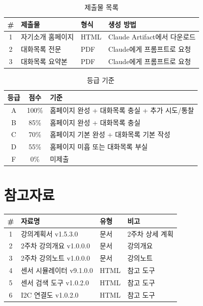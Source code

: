 \documentclass[11pt, a4paper]{article}
\begin{document}
\begin{table}[H]\centering
\caption{제출물 목록}
\begin{tabular}{clll}\toprule
\textbf{\#} & \textbf{제출물} & \textbf{형식} & \textbf{생성 방법} \\\midrule
1 & 자기소개 홈페이지 & HTML & Claude Artifact에서 다운로드 \\
2 & 대화목록 전문 & PDF & Claude에게 프롬프트로 요청 \\
3 & 대화목록 요약본 & PDF & Claude에게 프롬프트로 요청 \\
\bottomrule
\end{tabular}
\end{table}

\begin{table}[H]\centering
\caption{등급 기준}
\begin{tabular}{ccp{8cm}}\toprule
\textbf{등급} & \textbf{점수} & \textbf{기준} \\\midrule
A & 100\% & 홈페이지 완성 + 대화목록 충실 + 추가 시도/통찰 \\
B & 85\% & 홈페이지 완성 + 대화목록 충실 \\
C & 70\% & 홈페이지 기본 완성 + 대화목록 기본 작성 \\
D & 55\% & 홈페이지 미흡 또는 대화목록 부실 \\
F & 0\% & 미제출 \\
\bottomrule
\end{tabular}
\end{table}

\newpage
\section*{참고자료}

\begin{table}[H]\centering
\begin{tabular}{clll}\toprule
\textbf{\#} & \textbf{자료명} & \textbf{유형} & \textbf{비고} \\\midrule
1 & 강의계획서 v1.5.3.0 & 문서 & 2주차 상세 계획 \\
2 & 2주차 강의개요 v1.0.0.0 & 문서 & 강의개요 \\
3 & 2주차 강의노트 v1.0.0.0 & 문서 & 강의노트 \\
4 & 센서 시뮬레이터 v9.1.0.0 & HTML & 참고 도구 \\
5 & 센서 검색 도구 v1.0.2.0 & HTML & 참고 도구 \\
6 & I2C 연결도 v1.0.2.0 & HTML & 참고 도구 \\
\bottomrule
\end{tabular}
\end{table}
\end{document}
